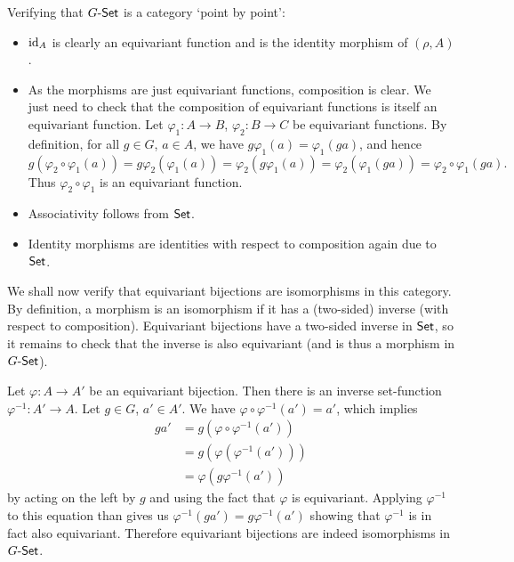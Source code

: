 \begin{solution}
	Verifying that $G\text{-}\mathsf{Set}$ is a category `point by point':
	\begin{itemize}
		\item $\mathrm{id}_A$ is clearly an equivariant function and is the identity morphism of $(\rho, A)$.
		
		\item As the morphisms are just equivariant functions, composition is clear. We just need to check that the composition of equivariant functions is itself an equivariant function. Let $\varphi_1: A \to B$, $\varphi_2: B \to C$ be equivariant functions. By definition, for all $g \in G$, $a \in A$, we have $g \varphi_1 (a) = \varphi_1 (ga)$, and hence 
		\[
			g (\varphi_2 \circ \varphi_1 (a)) = g \varphi_2 (\varphi_1(a)) = \varphi_2(g \varphi_1(a)) = \varphi_2(\varphi_1(ga)) = \varphi_2 \circ \varphi_1 (ga) \text{.}
		\]
		Thus $\varphi_2 \circ \varphi_1$ is an equivariant function.
		
		\item Associativity follows from $\mathsf{Set}$.
		
		\item Identity morphisms are identities with respect to composition again due to $\mathsf{Set}$.
	\end{itemize}
	
	We shall now verify that equivariant bijections are isomorphisms in this category. By definition, a morphism is an isomorphism if it has a (two-sided) inverse (with respect to composition). Equivariant bijections have a two-sided inverse in $\mathsf{Set}$, so it remains to check that the inverse is also equivariant (and is thus a morphism in $G\text{-}\mathsf{Set}$).
	
	Let $\varphi: A \to A'$ be an equivariant bijection. Then there is an inverse set-function $\varphi^{-1}: A' \to A$. Let $g \in G$, $a' \in A'$. We have $\varphi \circ \varphi^{-1}(a') = a'$, which implies
	\[
		\begin{aligned}
			ga' &= g(\varphi \circ \varphi^{-1}(a')) \\
			&= g(\varphi(\varphi^{-1}(a'))) \\
			&= \varphi(g\varphi^{-1}(a'))
		\end{aligned}
	\]
	by acting on the left by $g$ and using the fact that $\varphi$ is equivariant. Applying $\varphi^{-1}$ to this equation than gives us $\varphi^{-1}(ga') = g \varphi^{-1}(a')$ showing that $\varphi^{-1}$ is in fact also equivariant. Therefore equivariant bijections are indeed isomorphisms in $G\text{-}\mathsf{Set}$.
\end{solution}

